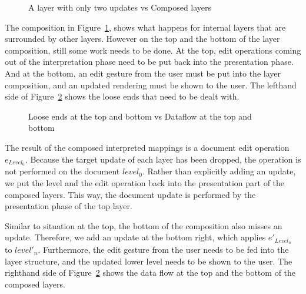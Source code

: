 \begin{figure}\begin{small}\begin{center}\begin{center}
\end{center}
\caption{A layer with only two updates vs Composed layers}\label{connectingLayers} 
\end{center}\end{small}\end{figure}

The composition in Figure~\ref{connectingLayers}, shows what happens for internal layers that are surrounded by other layers. However on the top and the bottom of the layer composition, still some work needs to be done. At the top, edit operations coming out of the interpretation phase need to be put back into the presentation phase. And at the bottom, an edit gesture from the user must be put into the layer composition, and an updated rendering must be shown to the user. The lefthand side of Figure~\ref{topAndBottom} shows the loose ends that need to be dealt with.

\begin{figure}\begin{small}\begin{center}\begin{center}
\end{center}
\caption{Loose ends at the top and bottom vs Dataflow at the top and bottom}\label{topAndBottom} 
\end{center}\end{small}\end{figure}


The result of the composed interpreted mappings is a document edit operation $e_{Level_0}$. Because the target update of each layer has been dropped, the operation is not performed on the document $level_0$. Rather than explicitly adding an update, we put the level and the edit operation back into the presentation part of the composed layers. This way, the document update is performed by the presentation phase of the top layer.

Similar to situation at the top, the bottom of the composition also misses an update. Therefore, we add an update at the bottom right, which applies $e'_{Level_n}$ to $level'_n$. Furthermore, the edit gesture from the user needs to be fed into the layer structure, and the updated lower level needs to be shown to the user. The righthand side of Figure~\ref{topAndBottom} shows the data flow at the top and the bottom of the composed layers.

